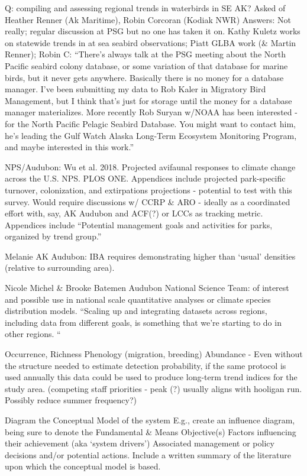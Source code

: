 \documentclass[]{article}
\begin{document}
Q: compiling and assessing regional trends in waterbirds in SE AK? Asked
of Heather Renner (Ak Maritime), Robin Corcoran (Kodiak NWR) Answers:
Not really; regular discussion at PSG but no one has taken it on. Kathy
Kuletz works on statewide trends in at sea seabird observations; Piatt
GLBA work (\& Martin Renner); Robin C: ``There's always talk at the PSG
meeting about the North Pacific seabird colony database, or some
variation of that database for marine birds, but it never gets anywhere.
Basically there is no money for a database manager. I've been submitting
my data to Rob Kaler in Migratory Bird Management, but I think that's
just for storage until the money for a database manager materializes.
More recently Rob Suryan w/NOAA has been interested - for the North
Pacific Pelagic Seabird Database. You might want to contact him, he's
leading the Gulf Watch Alaska Long-Term Ecosystem Monitoring Program,
and maybe interested in this work.''

NPS/Audubon: Wu et al. 2018. Projected avifaunal responses to climate
change across the U.S. NPS. PLOS ONE. Appendices include projected
park-specific turnover, colonization, and extirpations projections -
potential to test with this survey. Would require discussions w/ CCRP \&
ARO - ideally as a coordinated effort with, say, AK Audubon and ACF(?)
or LCCs as tracking metric.\\
Appendices include ``Potential management goals and activities for
parks, organized by trend group.''

Melanie AK Audubon: IBA requires demonstrating higher than `usual'
densities (relative to surrounding area).

Nicole Michel \& Brooke Batemen Audubon National Science Team: of
interest and possible use in national scale quantitative analyses or
climate species distribution models. ``Scaling up and integrating
datasets across regions, including data from different goals, is
something that we're starting to do in other regions. ``

Occurrence, Richness Phenology (migration, breeding) Abundance - Even
without the structure needed to estimate detection probability, if the
same protocol is used annually this data could be used to produce
long-term trend indices for the study area. (competing staff priorities
- peak (?) usually aligns with hooligan run. Possibly reduce summer
frequency?)

Diagram the Conceptual Model of the system E.g., create an influence
diagram, being sure to denote the Fundamental \& Means Objective(s)
Factors influencing their achievement (aka `system drivers') Associated
management or policy decisions and/or potential actions. Include a
written summary of the literature upon which the conceptual model is
based.
\end{document}
